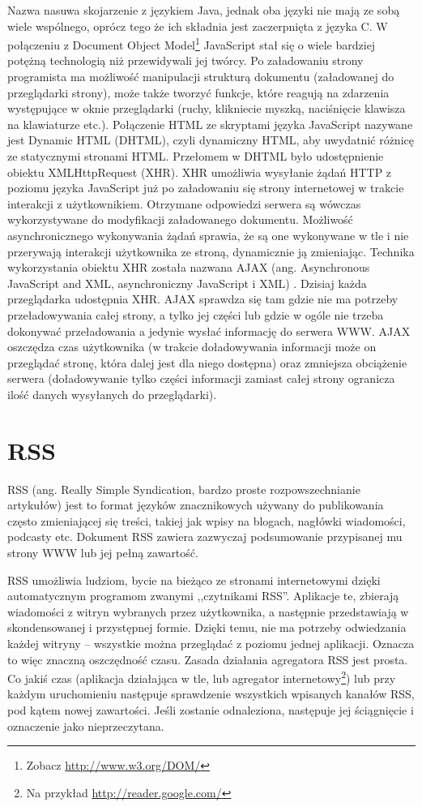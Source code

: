 \documentclass[a4paper,12pt,oneside]{report}
\begin{document}
Nazwa nasuwa skojarzenie z językiem Java, jednak oba języki nie mają ze sobą wiele wspólnego, oprócz tego że ich składnia jest zaczerpnięta z języka C. W połączeniu z Document Object Model\footnote{Zobacz \url{http://www.w3.org/DOM/}} JavaScript stał się o wiele bardziej potężną technologią niż przewidywali jej twórcy. Po załadowaniu strony programista ma możliwość manipulacji strukturą dokumentu (załadowanej do przeglądarki strony), może także tworzyć funkcje, które reagują na zdarzenia występujące w oknie przeglądarki (ruchy, klikniecie myszką, naciśnięcie klawisza na klawiaturze etc.). Połączenie HTML ze skryptami języka JavaScript nazywane jest Dynamic HTML (DHTML), czyli dynamiczny HTML, aby uwydatnić różnicę ze statycznymi stronami HTML. 
Przełomem w DHTML było udostępnienie obiektu XMLHttpRequest (XHR). XHR umożliwia wysyłanie żądań HTTP z poziomu języka JavaScript już po załadowaniu się strony internetowej w trakcie interakcji z użytkownikiem. Otrzymane odpowiedzi serwera są wówczas wykorzystywane do modyfikacji załadowanego dokumentu. Możliwość asynchronicznego wykonywania żądań sprawia, że są one wykonywane w tle i nie przerywają interakcji użytkownika ze stroną, dynamicznie ją zmieniając. Technika wykorzystania obiektu XHR została nazwana AJAX (ang. Asynchronous JavaScript and XML, asynchroniczny JavaScript i XML) . Dzisiaj każda przeglądarka udostępnia XHR. AJAX sprawdza się tam gdzie nie ma potrzeby przeładowywania całej strony, a tylko jej części lub gdzie w ogóle nie trzeba dokonywać przeładowania a jedynie wysłać informację do serwera WWW. AJAX oszczędza czas użytkownika (w trakcie doładowywania informacji może on przeglądać stronę, która dalej jest dla niego dostępna) oraz zmniejsza obciążenie serwera (doładowywanie tylko części informacji zamiast całej strony ogranicza ilość danych wysyłanych do przeglądarki). 

\section{RSS}
\label{sec:rss}
RSS (ang. Really Simple Syndication, bardzo proste rozpowszechnianie artykułów) jest to format języków znacznikowych używany do publikowania często zmieniającej się treści, takiej jak wpisy na blogach, nagłówki wiadomości, podcasty etc. Dokument RSS zawiera zazwyczaj podsumowanie przypisanej mu strony WWW lub jej pełną zawartość. 

RSS umożliwia ludziom, bycie na bieżąco ze stronami internetowymi dzięki automatycznym programom zwanymi ,,czytnikami RSS''. Aplikacje te, zbierają wiadomości z witryn wybranych przez użytkownika, a następnie przedstawiają w skondensowanej i przystępnej formie. Dzięki temu, nie ma potrzeby odwiedzania każdej witryny -- wszystkie można przeglądać z poziomu jednej aplikacji. Oznacza to więc znaczną oszczędność czasu. Zasada działania agregatora RSS jest prosta. Co jakiś czas (aplikacja działająca w tle, lub agregator internetowy\footnote{Na przykład \url{http://reader.google.com/}}) lub przy każdym uruchomieniu następuje sprawdzenie wszystkich wpisanych kanałów RSS, pod kątem nowej zawartości. Jeśli zostanie odnaleziona, następuje jej ściągnięcie i oznaczenie jako nieprzeczytana. 
\end{document}
